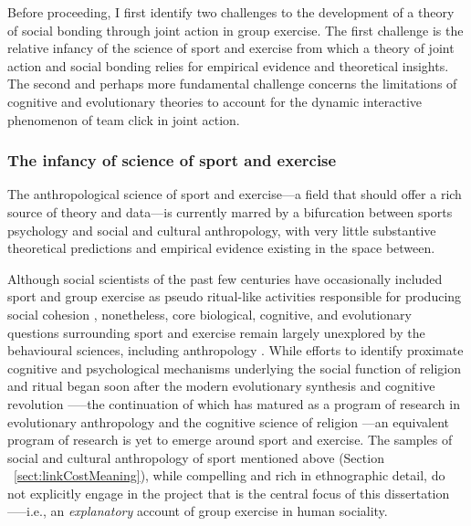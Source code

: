 \begin{CJK}{UTF8}{gbsn}
Before proceeding, I first identify two challenges to the development of a theory of social bonding through joint action in group exercise.  The first challenge is the relative infancy of the science of sport and exercise from which a theory of joint action and social bonding relies for empirical evidence and theoretical insights.  The second and perhaps more fundamental challenge concerns the limitations of cognitive and evolutionary theories to account for the dynamic interactive phenomenon of team click in joint action.

\subsubsection{The infancy of science of sport and exercise}
The anthropological science of sport and exercise---a field that should offer a rich source of theory and data---is currently marred by a bifurcation between sports psychology and social and cultural anthropology, with very little substantive theoretical predictions and empirical evidence existing in the space between.

Although social scientists of the past few centuries have occasionally included sport and group exercise as pseudo ritual-like activities responsible for producing social cohesion \citep{Durkheim1965,Mauss1935,Turner1977}, nonetheless, core biological, cognitive, and evolutionary questions surrounding sport and exercise remain largely unexplored by the behavioural sciences, including anthropology \citep{Blanchard1995,Downey2005a}.    While efforts to identify proximate cognitive and psychological mechanisms underlying the social function of religion and ritual began soon after the modern evolutionary synthesis \citep{Huxley1942} and cognitive revolution \citep[e.g.,][]{Turner1986}—--the continuation of which has matured as a program of research in evolutionary anthropology and the cognitive science of religion \citep{Barrett2002,Lawson1993,Sperber1996,Whitehouse2004}---an equivalent program of research is yet to emerge around sport and exercise.  The samples of social and cultural anthropology of sport mentioned above (Section ~\ref{sect:linkCostMeaning}), while compelling and rich in ethnographic detail, do not explicitly engage in the project that is the central focus of this dissertation—--i.e., an \textit{explanatory} account of group exercise in human sociality.


\end{CJK}
